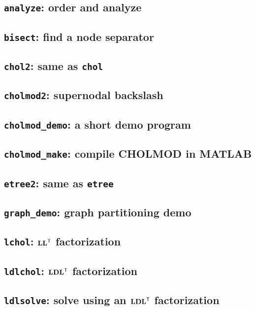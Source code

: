 \documentclass[11pt]{article}
\newcommand{\m}[1]{{\bf{#1}}}       %
\newcommand{\tr}{^{\sf T}}          %
\begin{document}
\newpage
\subsection{{\tt analyze}: order and analyze}					
\subsection{{\tt bisect}: find a node separator}				
\subsection{{\tt chol2}: same as {\tt chol}}					
\newpage
\subsection{{\tt cholmod2}: supernodal backslash}				
\newpage
\subsection{{\tt cholmod\_demo}: a short demo program}				
\subsection{{\tt cholmod\_make}: compile CHOLMOD in MATLAB}			
\newpage
\subsection{{\tt etree2}: same as {\tt etree}}					
\newpage
\subsection{{\tt graph\_demo}: graph partitioning demo}				
\newpage
\subsection{{\tt lchol}: $\m{LL}\tr$ factorization}				
\subsection{{\tt ldlchol}: $\m{LDL}\tr$ factorization}				
\newpage
\subsection{{\tt ldlsolve}: solve using an $\m{LDL}\tr$ factorization}		
\end{document}
